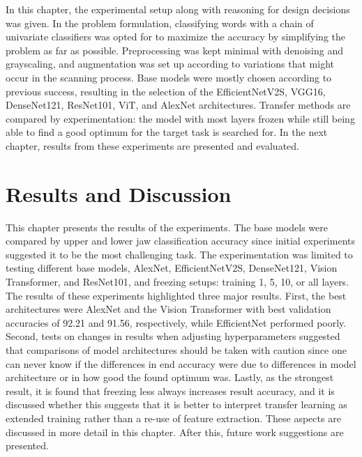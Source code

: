 \documentclass[english,twoside,openright]{UH_DS_MSc}
\begin{document}
In this chapter, the experimental setup along with reasoning for design decisions was given.
In the problem formulation, classifying words with a chain of univariate classifiers was opted for to 
maximize the accuracy by simplifying the problem as far as possible.
Preprocessing was kept minimal with denoising and grayscaling, 
and augmentation was set up according to variations that might occur in the scanning process. Base models were mostly
chosen according to previous success, resulting in the selection of the EfficientNetV2S, VGG16, DenseNet121, ResNet101, ViT, and AlexNet architectures.
Transfer methods are compared by experimentation: the model with most layers frozen while still being able to find a good optimum 
for the target task is searched for. In the next chapter, 
results from these experiments are presented and evaluated.

\chapter{Results and Discussion}

This chapter presents the results of the experiments. The base models were compared by
upper and lower jaw classification accuracy since initial experiments suggested it to be the most challenging task. The experimentation was limited to testing different base models, AlexNet, EfficientNetV2S, 
DenseNet121, Vision Transformer, and ResNet101, and freezing setups: training 1, 5, 10, or all layers.
The results of these experiments highlighted three major results. First, the best architectures were AlexNet and the Vision 
Transformer with best validation accuracies of 92.21 and 91.56, respectively, while EfficientNet performed poorly. Second, tests on changes in results 
when adjusting hyperparameters suggested that comparisons of model architectures should be taken with caution since one can never know 
if the differences in end accuracy were due to differences in model architecture or in how good the found optimum was. Lastly, as the strongest result, it is found that freezing less 
always increases result accuracy, and it is discussed whether this suggests that it is better to interpret transfer learning as extended 
training rather than a re-use of feature extraction. These aspects are discussed in more detail in this chapter. After this, future work suggestions are presented.
\end{document}
